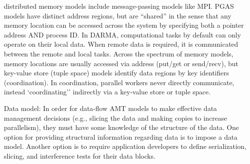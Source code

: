 \begin{compactdesc}
  \Glspl{distributed memory
  model} include message-passing models like MPI. \gls{PGAS} models have distinct address regions,
  but are ``shared'' in the sense that any memory location can be accessed 
  across the system by specifying both a pointer address AND process ID. 
  In \gls{DARMA}, computational tasks by default can only operate on their local data. When remote data
  is required, it is communicated between the remote and local tasks.
  Across the spectrum of memory models, memory locations are usually
  accessed via address (put/get or send/recv), but \gls{key-value store}
  (\gls{tuple space}) models identify data regions by key identifiers (coordination).
  In coordination, parallel workers never directly communicate, instead `coordinating'' 
  indirectly via a \gls{key-value store} or \gls{tuple space}.  
\item[Data model:]
  In order for data-flow \gls{AMT} models to make effective data management
  decisions (e.g., \gls{slicing} the data and making copies to increase
  parallelism), they must have some knowledge of the structure of the data.
  One option for providing structural information regarding data is to impose a
  \gls{data model}.  Another option is to require application developers to define
  \gls{serialization}, \gls{slicing}, and \glspl{interference test} for their data blocks. 
\end{compactdesc}


